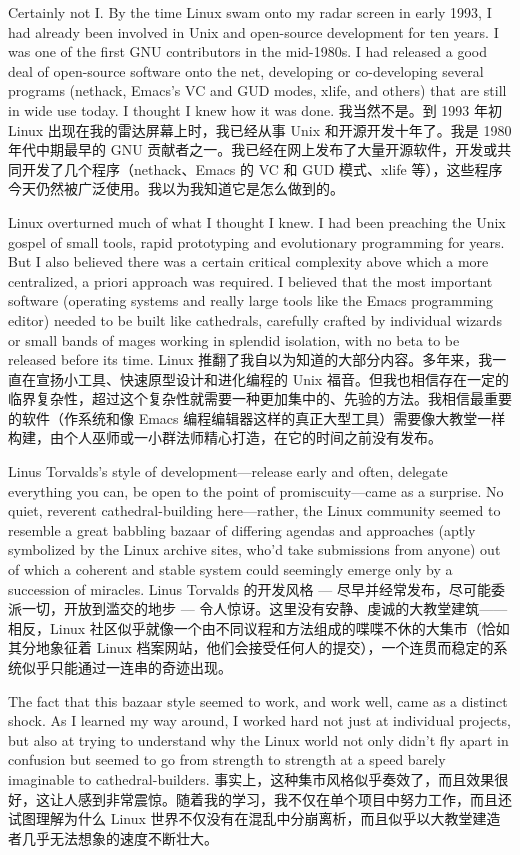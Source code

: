 \documentclass[a4paper,12pt,UTF8,twoside]{ctexbook}
\begin{document}
Certainly not I. By the time Linux swam onto my radar screen in early 1993, I had already been involved in Unix and open-source development for ten years. I was one of the first GNU contributors in the mid-1980s. I had released a good deal of open-source software onto the net, developing or co-developing several programs (nethack, Emacs's VC and GUD modes, xlife, and others) that are still in wide use today. I thought I knew how it was done.
我当然不是。到 1993 年初 Linux 出现在我的雷达屏幕上时，我已经从事 Unix 和开源开发十年了。我是 1980 年代中期最早的 GNU 贡献者之一。我已经在网上发布了大量开源软件，开发或共同开发了几个程序（nethack、Emacs 的 VC 和 GUD 模式、xlife 等），这些程序今天仍然被广泛使用。我以为我知道它是怎么做到的。

Linux overturned much of what I thought I knew. I had been preaching the Unix gospel of small tools, rapid prototyping and evolutionary programming for years. But I also believed there was a certain critical complexity above which a more centralized, a priori approach was required. I believed that the most important software (operating systems and really large tools like the Emacs programming editor) needed to be built like cathedrals, carefully crafted by individual wizards or small bands of mages working in splendid isolation, with no beta to be released before its time.
Linux 推翻了我自以为知道的大部分内容。多年来，我一直在宣扬小工具、快速原型设计和进化编程的 Unix 福音。但我也相信存在一定的临界复杂性，超过这个复杂性就需要一种更加集中的、先验的方法。我相信最重要的软件（作系统和像 Emacs 编程编辑器这样的真正大型工具）需要像大教堂一样构建，由个人巫师或一小群法师精心打造，在它的时间之前没有发布。

Linus Torvalds's style of development—release early and often, delegate everything you can, be open to the point of promiscuity—came as a surprise. No quiet, reverent cathedral-building here—rather, the Linux community seemed to resemble a great babbling bazaar of differing agendas and approaches (aptly symbolized by the Linux archive sites, who'd take submissions from anyone) out of which a coherent and stable system could seemingly emerge only by a succession of miracles.
Linus Torvalds 的开发风格 — 尽早并经常发布，尽可能委派一切，开放到滥交的地步 — 令人惊讶。这里没有安静、虔诚的大教堂建筑——相反，Linux 社区似乎就像一个由不同议程和方法组成的喋喋不休的大集市（恰如其分地象征着 Linux 档案网站，他们会接受任何人的提交），一个连贯而稳定的系统似乎只能通过一连串的奇迹出现。

The fact that this bazaar style seemed to work, and work well, came as a distinct shock. As I learned my way around, I worked hard not just at individual projects, but also at trying to understand why the Linux world not only didn't fly apart in confusion but seemed to go from strength to strength at a speed barely imaginable to cathedral-builders.
事实上，这种集市风格似乎奏效了，而且效果很好，这让人感到非常震惊。随着我的学习，我不仅在单个项目中努力工作，而且还试图理解为什么 Linux 世界不仅没有在混乱中分崩离析，而且似乎以大教堂建造者几乎无法想象的速度不断壮大。
\end{document}
